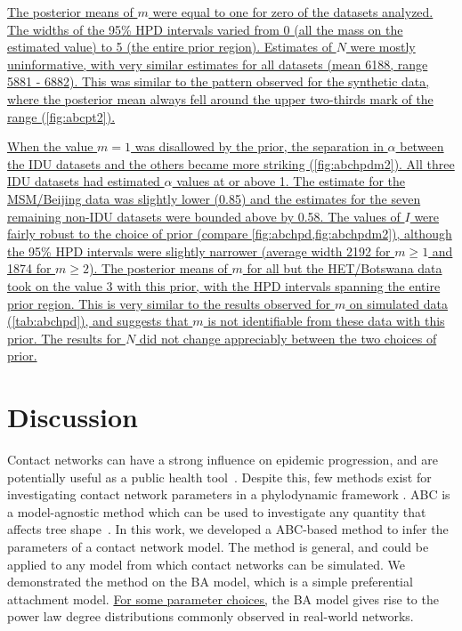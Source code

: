 \documentclass[12pt]{article}\usepackage[]{graphicx}\usepackage[]{color}
\let\mref\cref
\renewcommand{\cref}[1]{\mbox{\mref{#1}}}
\newcommand{\add}[1]{\color{blue} \uline{#1} \color{black}}
\begin{document}
\add{The posterior means of $m$ were equal to one for 
  zero
of the datasets analyzed. The widths of the 95\% HPD intervals varied from 0
(all the mass on the estimated value) to 5 (the entire prior region). Estimates
of $N$ were  mostly uninformative, with very similar estimates for all datasets
(mean
    6188,
range
    5881 - 6882).
This was similar to the pattern observed for the synthetic data, where the
posterior mean always fell around the upper two-thirds mark of the range
(\cref{fig:abcpt2}).}

\add{When the value $m = 1$ was disallowed by the prior, the separation in
$\alpha$ between the IDU datasets and the others became more striking
(\cref{fig:abchpdm2}). All three IDU datasets had estimated $\alpha$ values at
or above
    1.
The estimate for the MSM/Beijing data was slightly lower
    (0.85) and
the estimates for the seven remaining non-IDU datasets were bounded above by
    0.58. 
The values of $I$ were fairly robust to the choice of prior (compare
\cref{fig:abchpd,fig:abchpdm2}), although the 95\% HPD intervals were slightly
narrower (average width
    2192
for $m \geq 1$ and
    1874
for $m \geq 2$). The posterior means of $m$ for all but the HET/Botswana data
took on the value 3 with this prior, with the HPD intervals spanning the entire
prior region. This is very similar to the results observed for $m$ on simulated
data (\cref{tab:abchpd}), and suggests that $m$ is not identifiable from these
data with this prior. The results for $N$ did not change appreciably between
the two choices of prior.}

\section*{Discussion}

Contact networks can have a strong influence on epidemic progression, and are
potentially useful as a public health tool~\autocite{wang2015targeting,
little2014using}. Despite this, few methods exist for investigating contact
network parameters in a phylodynamic framework \autocite[although see][for
related work]{groendyke2011bayesian, volz2008sir, brown2011transmission,
leventhal2012inferring}. ABC is a model-agnostic method which can be used to
investigate any quantity that affects tree
shape~\autocite{poon2015phylodynamic}. In this work, we developed a ABC-based
method to infer the parameters of a contact network model. The method is
general, and could be applied to any model from which contact networks can be
simulated. We demonstrated the method on the BA model, which is a simple
preferential attachment model. \add{For some parameter choices,} the BA model
gives rise to the power law degree distributions commonly observed in
real-world networks.
\end{document}
